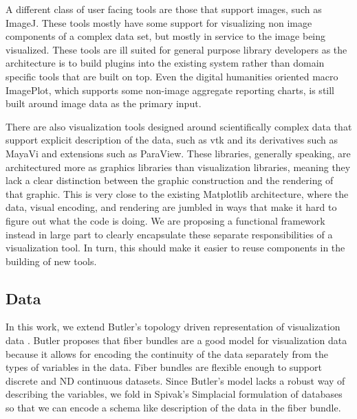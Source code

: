 \documentclass[../main.tex]{subfiles}
\begin{document}
A different class of user facing tools are those that support images, such as ImageJ\cite{schneiderNIHImageImageJ2012}. These tools mostly have some support for visualizing non image components of a complex data set, but mostly in service to the image being visualized. These tools are ill suited for general purpose library developers as the architecture is to build plugins into the existing system \cite{WritingPlugins} rather than domain specific tools that are built on top. Even the digital humanities oriented macro ImagePlot\cite{studiesCulturevisImageplot2021}, which supports some non-image aggregate reporting charts, is still built around image data as the primary input. 

There are also visualization tools designed around scientifically complex data that support explicit description of the data, such as vtk\cite{hanwellVisualizationToolkitVTK2015,geveci2012vtk} and its derivatives such as MayaVi\cite{ramachandranMayaVi2011} and extensions such as ParaView\cite{ahrens2005paraview}. These libraries, generally speaking, are architectured more as graphics libraries than visualization libraries, meaning they lack a clear distinction between the graphic construction and the rendering of that graphic. This is very close to the existing Matplotlib architecture, where the data, visual encoding, and rendering are jumbled in ways that make it hard to figure out what the code is doing. We are proposing a functional framework instead in large part to clearly encapsulate these separate responsibilities of a visualization tool. In turn, this should make it easier to reuse components in the building of new tools. 

\subsection{Data}
\label{sec:intro_data}
In this work, we extend Butler's topology driven representation of visualization data \cite{butlerVisualizationModelBased1989,butlerVectorBundleClassesForm1992}. Butler proposes that fiber bundles are a good model for visualization data because it allows for encoding the continuity of the data separately from the types of variables in the data. Fiber bundles are flexible enough to support discrete and ND continuous datasets. Since Butler's model lacks a robust way of describing the variables, we fold in Spivak's Simplacial formulation of databases \cite{spivakDatabasesAreCategories2010,spivakSIMPLICIALDATABASES} so that we can encode a schema like description of the data in the fiber bundle.
\end{document}
